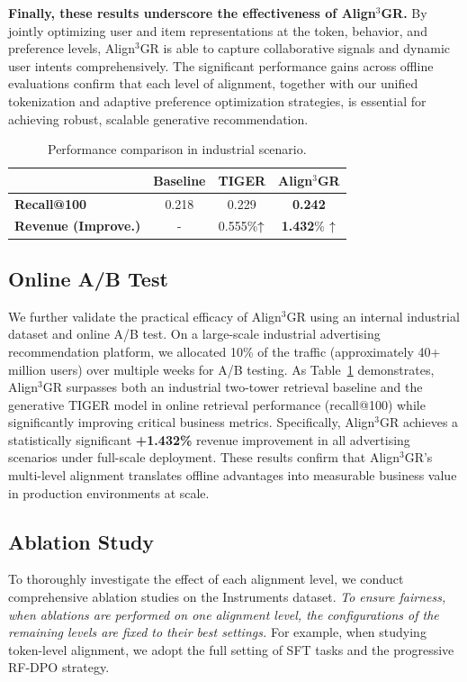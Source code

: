 \documentclass[letterpaper]{article} %
\begin{document}
%
\textbf{Finally, these results underscore the effectiveness of Align$^3$GR.} By jointly optimizing user and item representations at the token, behavior, and preference levels, Align$^3$GR is able to capture collaborative signals and dynamic user intents comprehensively. The significant performance gains across offline evaluations confirm that each level of alignment, together with our unified tokenization and adaptive preference optimization strategies, is essential for achieving robust, scalable generative recommendation.
%
%
\begin{table}[t]
\centering
\small
\setlength{\tabcolsep}{4.5pt}
\begin{tabular}{l|ccc}
\toprule
~      & \textbf{Baseline} & \textbf{TIGER} & \textbf{Align$^3$GR}    \\
\midrule
\textbf{Recall@100}        & 0.218 & 0.229  & \textbf{0.242}  \\
\textbf{Revenue (Improve.)}        & - & 0.555\%$\textcolor{black}{\uparrow}$   & \textbf{1.432}\% $\textcolor{black}{\uparrow}$  \\
\bottomrule
\end{tabular}
\caption{Performance comparison in industrial scenario.}
\label{tab:industry_data}
\end{table}
%

%
\subsection{Online A/B Test}
We further validate the practical efficacy of Align$^3$GR using an internal industrial dataset and online A/B test. On a large-scale industrial advertising recommendation platform, we allocated 10\% of the traffic (approximately 40+ million users) over multiple weeks for A/B testing. As Table~\ref{tab:industry_data} demonstrates, Align$^3$GR surpasses both an industrial two-tower retrieval baseline and the generative TIGER model in online retrieval performance (recall@100) while significantly improving critical business metrics. Specifically, Align$^3$GR achieves a statistically significant \textbf{+1.432\%} revenue improvement in all advertising scenarios under full-scale deployment.
%
These results confirm that Align$^3$GR's multi-level alignment translates offline advantages into measurable business value in production environments at scale.
%

%
\subsection{Ablation Study}
To thoroughly investigate the effect of each alignment level, we conduct comprehensive ablation studies on the Instruments dataset. \textit{To ensure fairness, when ablations are performed on one alignment level, the configurations of the remaining levels are fixed to their best settings.} For example, when studying token-level alignment, we adopt the full setting of SFT tasks and the progressive RF-DPO strategy.
%
\end{document}
